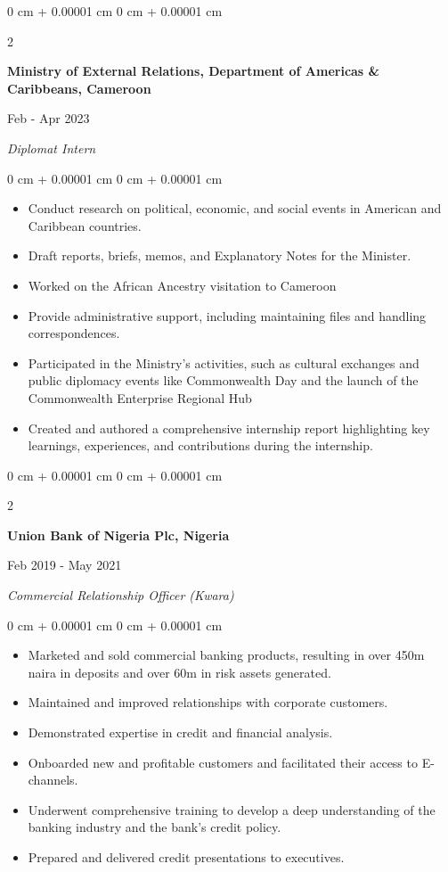 \documentclass[10pt, letterpaper]{article}
\newenvironment{onecolentry}{
    \begin{adjustwidth}{
        0 cm + 0.00001 cm
    }{
        0 cm + 0.00001 cm
    }
}{
    \end{adjustwidth}
} %
\newenvironment{twocolentry}[2][]{
    \onecolentry
    \def\secondColumn{#2}
    \setcolumnwidth{\fill, 4.5 cm}
    \begin{paracol}{2}
}{
    \switchcolumn \raggedleft \secondColumn
    \end{paracol}
    \endonecolentry
} %
\begin{document}
\vspace{0.6cm}

\begin{twocolentry}{
Feb - Apr 2023
}
\textbf{Ministry of External Relations, Department of Americas \& Caribbeans, Cameroon}
\end{twocolentry}
\textit{Diplomat Intern}
\begin{onecolentry}
    \begin{itemize}
    \item Conduct research on political, economic, and social events in American and Caribbean countries.
    \item Draft reports, briefs, memos, and Explanatory Notes for the Minister.
    \item Worked on the African Ancestry visitation to Cameroon
    \item Provide administrative support, including maintaining files and handling correspondences.
    \item Participated in the Ministry’s activities, such as cultural exchanges and public diplomacy events like Commonwealth Day and the launch of the Commonwealth Enterprise Regional Hub
    \item Created and authored a comprehensive internship report highlighting key learnings, experiences, and contributions during the internship.\end{itemize}
\end{onecolentry}

\vspace{0.6cm}

\begin{twocolentry}{
Feb 2019 - May 2021
}
\textbf{Union Bank of Nigeria Plc, Nigeria}
\end{twocolentry}
 \textit{Commercial Relationship Officer (Kwara)}
\begin{onecolentry}
\begin{itemize}
    \item Marketed and sold commercial banking products, resulting in over 450m naira in deposits and over 60m in risk assets generated.
    \item Maintained and improved relationships with corporate customers.
    \item Demonstrated expertise in credit and financial analysis.
    \item Onboarded new and profitable customers and facilitated their access to E-channels.
    \item Underwent comprehensive training to develop a deep understanding of the banking industry and the bank's credit policy.
    \item Prepared and delivered credit presentations to executives.
\end{itemize}
\end{onecolentry}
\end{document}
